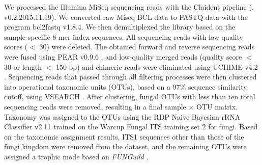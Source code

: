 We processed the Illumina MiSeq sequencing reads with the Claident pipeline (\citealp{Tanabe2013}, v0.2.2015.11.19). We converted raw Miseq BCL data to FASTQ data with the program bcl2fastq v1.8.4. We then demultiplexed the library based on the sample-specific 8-mer index sequences. All sequencing reads with low quality scores ($<$ 30) were deleted. The obtained forward and reverse sequencing reads were fused using PEAR v0.9.6 \citep{Zhang2014}, and low-quality merged reads (quality score $<$ 30 or length $<$ 150 bp) and chimeric reads were eliminated using UCHIME v4.2 \citep{Edgar2011}. Sequencing reads that passed through all filtering processes were then clustered into operational taxonomic units (OTUs), based on a 97$\%$ sequence similarity cutoff, using VSEARCH \citep{Rognes2016}. After clustering, fungal OTUs with less than ten total sequencing reads were removed, resulting in a final sample $\times$ OTU matrix. Taxonomy was assigned to the OTUs using the RDP Naive Bayesian rRNA Classifier v2.11 \citep{Wang2007} trained on the Warcup Fungal ITS training set 2 \citep{Deshpande2016} for fungi. Based on the taxonomic assignment results, ITS1 sequences other than those of the fungi kingdom were removed from the dataset, and the remaining OTUs were assigned a trophic mode based on \textit{FUNGuild} \citep{Nguyen2016}.
\par



